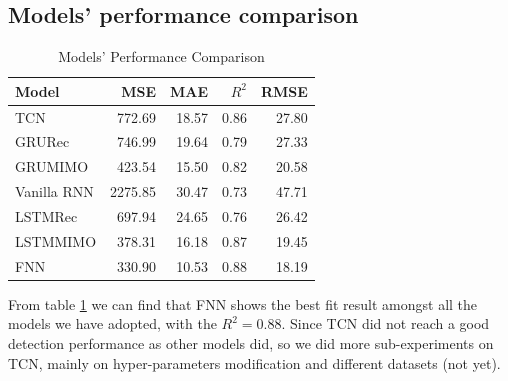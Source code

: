\subsection{Models' performance comparison}
\begin{table}[H]
\centering
\caption{Models' Performance Comparison}
\begin{tabular}{l r r r r}
\toprule
\textbf{Model} & \textbf{MSE} & \textbf{MAE} & \textbf{$R^2$}& \textbf{RMSE}\\
\midrule
TCN & 772.69& 18.57& 0.86& 27.80\\
GRU\-Rec & 746.99& 19.64& 0.79& 27.33 \\
GRU\-MIMO& 423.54& 15.50& 0.82& 20.58 \\
Vanilla RNN& 2275.85& 30.47& 0.73& 47.71 \\
LSTM\-Rec & 697.94& 24.65& 0.76& 26.42 \\
LSTM\-MIMO & 378.31& 16.18& 0.87& 19.45 \\
FNN & 330.90& 10.53& \color{red}0.88& 18.19 \\
\bottomrule
\end{tabular}
\label{tab:models}
\end{table}

From table \ref{tab:models} we can find that FNN shows the best fit result amongst all the models we have adopted, with the $R^2 = 0.88$. Since TCN did not reach a good detection performance as other models did, so we did more sub-experiments on TCN, mainly on hyper-parameters modification and different datasets (not yet).

